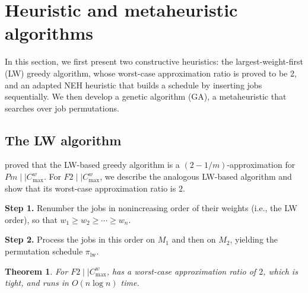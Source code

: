 \documentclass[12pt]{article} \textheight=24.5cm \textwidth=16.5cm \parskip = 0.165cm
\newtheorem{theorem}{Theorem}[section]
\let\origsection\section
\renewcommand{\section}{\FloatBarrier\origsection}
\begin{document}
\begin{sloppypar}
        
        
        \section{Heuristic and metaheuristic algorithms} \label{sec:heuristics}
        
        In this section, we first present two constructive heuristics: the largest-weight-first (LW) greedy algorithm, whose worst-case approximation ratio is proved to be 2, and an adapted NEH heuristic that builds a schedule by inserting jobs sequentially. We then develop a genetic algorithm (GA), a metaheuristic that searches over job permutations.
        
        
        \subsection{The LW algorithm} \label{sec:lw}
        
        \cite{Sun2024JOCO} proved that the LW-based greedy algorithm is a $(2-1/m)$-approximation for $Pm \mid \mid C_{\max}^w$. For $F2 \mid \mid C_{\max}^w$, we describe the analogous LW-based algorithm and show that its worst-case approximation ratio is $2$.
        
        \begin{algorithm}[H]
            \small
            \linespread{1.2}\selectfont
            \SetAlgoLined
            \DontPrintSemicolon
            \caption{LW's rule for $F2 \mid \mid C_{\max}^w$} \label{Alg-LW}
            \BlankLine
            \textbf{Step 1.} Renumber the jobs in nonincreasing order of their weights (i.e., the LW order), so that $w_1 \geq w_2 \geq \cdots \geq w_n$. \;
            
            \textbf{Step 2.} Process the jobs in this order on $M_1$ and then on $M_2$, yielding the permutation schedule $\pi_{\mathrm{lw}}$. \;
            
        \end{algorithm}
        
        \begin{theorem}\label{Thm-LW}
            For $F2 \mid \mid C_{\max}^w$,  has a worst-case approximation ratio of $2$, which is tight, and runs in $O(n\log n)$ time.
        \end{theorem}
        

\end{sloppypar}
\end{document}
